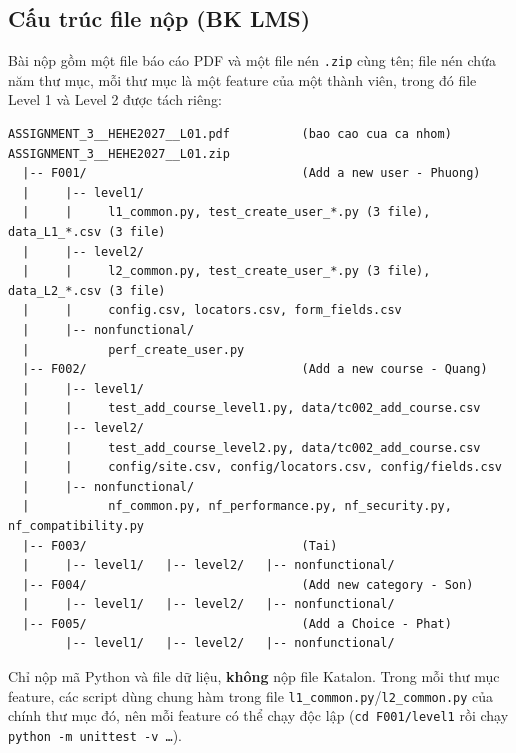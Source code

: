 \documentclass[12pt,a4paper]{article}
\begin{document}
\subsection*{Cấu trúc file nộp (BK LMS)}
Bài nộp gồm một file báo cáo PDF và một file nén \texttt{.zip} cùng tên; file nén chứa năm thư mục, mỗi thư mục là một feature của một thành viên, trong đó file Level 1 và Level 2 được tách riêng:
\begin{lstlisting}
ASSIGNMENT_3__HEHE2027__L01.pdf          (bao cao cua ca nhom)
ASSIGNMENT_3__HEHE2027__L01.zip
  |-- F001/                              (Add a new user - Phuong)
  |     |-- level1/
  |     |     l1_common.py, test_create_user_*.py (3 file), data_L1_*.csv (3 file)
  |     |-- level2/
  |     |     l2_common.py, test_create_user_*.py (3 file), data_L2_*.csv (3 file)
  |     |     config.csv, locators.csv, form_fields.csv
  |     |-- nonfunctional/
  |           perf_create_user.py
  |-- F002/                              (Add a new course - Quang)
  |     |-- level1/
  |     |     test_add_course_level1.py, data/tc002_add_course.csv
  |     |-- level2/
  |     |     test_add_course_level2.py, data/tc002_add_course.csv
  |     |     config/site.csv, config/locators.csv, config/fields.csv
  |     |-- nonfunctional/
  |           nf_common.py, nf_performance.py, nf_security.py, nf_compatibility.py
  |-- F003/                              (Tai)
  |     |-- level1/   |-- level2/   |-- nonfunctional/
  |-- F004/                              (Add new category - Son)
  |     |-- level1/   |-- level2/   |-- nonfunctional/
  |-- F005/                              (Add a Choice - Phat)
        |-- level1/   |-- level2/   |-- nonfunctional/
\end{lstlisting}
Chỉ nộp mã Python và file dữ liệu, \textbf{không} nộp file Katalon. Trong mỗi thư mục feature, các script dùng chung hàm trong file \texttt{l1\_common.py}/\texttt{l2\_common.py} của chính thư mục đó, nên mỗi feature có thể chạy độc lập (\texttt{cd F001/level1} rồi chạy \texttt{python -m unittest -v \ldots}).
\end{document}
